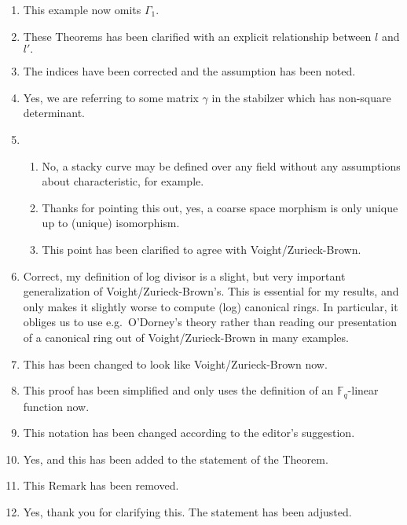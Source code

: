 \documentclass[12pt]{article}
\begin{document}
\begin{enumerate}
		\item This example now omits $\Gamma_1.$
		
		\item These Theorems has been clarified with an explicit relationship between $l$ and $l'.$ 
		
		\item The indices have been corrected and the assumption has been noted.
		
		\item Yes, we are referring to some matrix $\gamma$ in the stabilzer which has non-square determinant.
		
		\item
		\begin{enumerate}
			\item No, a stacky curve may be defined over any field without any assumptions about characteristic, for example.  
			\item Thanks for pointing this out, yes, a coarse space morphism is only unique up to (unique) isomorphism. 
			\item This point has been clarified to agree with Voight/Zurieck-Brown. 
		\end{enumerate}	
		
		\item Correct, my definition of log divisor is a slight, but very important generalization of Voight/Zurieck-Brown's. This is essential for my results, and only makes it slightly worse to compute (log) canonical rings. In particular, it obliges us to use e.g.\ O'Dorney's theory rather than reading our presentation of a canonical ring out of Voight/Zurieck-Brown in many examples. 
		
		\item This has been changed to look like Voight/Zurieck-Brown now. 
		
		\item This proof has been simplified and only uses the definition of an $\mathbb{F}_q$-linear function now. 
		
		\item This notation has been changed according to the editor's suggestion. 
		
		\item Yes, and this has been added to the statement of the Theorem.
		
		\item This Remark has been removed.
		
		\item Yes, thank you for clarifying this. The statement has been adjusted.
		

\end{enumerate}
\end{document}

